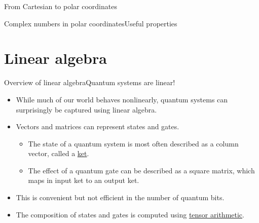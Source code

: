 \begin{frame}{From Cartesian to polar coordinates}
\end{frame}

\begin{frame}{Complex numbers in polar coordinates}{Useful properties}
    
\end{frame}

\section{Linear algebra}

\begin{frame}{Overview of linear algebra}{Quantum systems are linear!}
\begin{itemize}
    \item While much of our world behaves nonlinearly, quantum systems can surprisingly be captured using linear algebra.
    \item Vectors and matrices can represent states and gates.  
    \begin{itemize}
        \item The state of a quantum system is most often described as a column vector, called a \href{https://en.wikipedia.org/wiki/Bra-ket_notation}{ket}.
         \item The effect of a quantum gate can be described as a square matrix, which maps in input ket to an output ket.
    \end{itemize}
    \item This is convenient but not efficient in the number of quantum bits.
    \item The composition of states and gates is computed using \href{https://en.wikipedia.org/wiki/Tensor}{tensor arithmetic}.
\end{itemize}
    
\end{frame}

